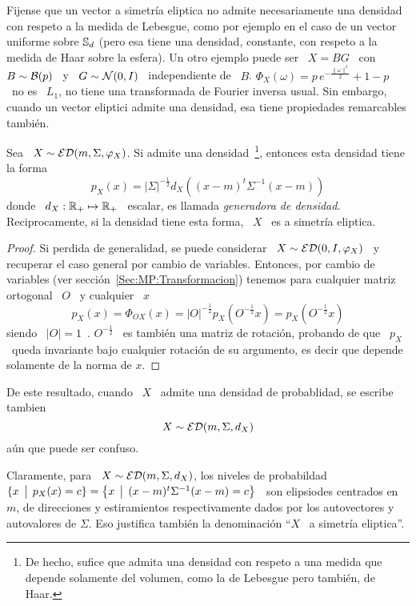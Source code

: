 Fijense  que  un vector  a  simetr\'ia  eliptica  no admite  necesariamente  una
densidad con respeto a la medida de  Lebesgue, como por ejemplo en el caso de un
vector uniforme  sobre $\mathbb{S}_d$  (pero esa tiene  una densidad,  constante, con
respeto a la medida de Haar sobre la esfera). Un otro ejemplo puede ser \ $X = B
G$  \ con  \  $B \sim  \mathcal{B}(p)$  \  y \  $G  \sim \mathcal{N}(0,I)$  \  independiente de  \
$B$. $\Phi_X(\omega)  = p \, e^{-\frac{\|  \omega \|^2}{2}} + 1  - p$ \  no es \
$L_1$,  \ie no tiene  una transformada  de Fourier  inversa usual.  Sin embargo,
cuando un vector eliptici admite una densidad, esa tiene propiedades remarcables
tambi\'en.
%
\begin{teorema}
%
  Sea \ $X \sim \mathcal{ED}(m,\Sigma,\varphi_X)$. Si  admite una  densidad~\footnote{De hecho, sufice  que admita
    una densidad  con respeto  a una medida  que depende solamente  del volumen,
    como la de Lebesgue pero  tambi\'en, de Haar.}, entonces esta densidad tiene
  la forma
  \[
  p_X(x)  = |\Sigma|^{-\frac12} d_X\left( (x-m)^t \Sigma^{-1} (x-m) \right)
  \]
  donde \ $d_X:  \mathbb{R}_+ \mapsto \mathbb{R}_+$ \ escalar,  es llamada {\em generadora
    de densidad}. Reciprocamente, si la densidad  tiene esta forma, \ $X$ \ es a
  simetr\'ia eliptica.
\end{teorema}
%
\begin{proof}
  Si perdida de generalidad, se puede considerar \ $X \sim \mathcal{ED}(0,I,\varphi_X)$ \
  y recuperar el  caso general por cambio de variables.  Entonces, por cambio de
  variables  (ver secci\'on~\ref{Sec:MP:Transformacion}) tenemos  para cualquier
  matriz ortogonal \ $O$ \ y cualquier \ $x$
  \[
  p_X(x) = \Phi_{O X}(x) = |O|^{-\frac12} p_X\left( O^{-\frac12} x \right) = p_X\left( O^{-\frac12} x \right)
  \]
  siendo \ $|O|  = 1$~\cite{Bha97, HorJoh13}. $O^{-\frac12}$ \  es tambi\'en una
  matriz  de  rotaci\'on,  probando de  que  \  $p_X$  \ queda  invariante  bajo
  cualquier rotaci\'on  de su  argumento, es decir  que depende solamente  de la
  norma de $x$.
\end{proof}

De este resultado, cuando \ $X$ \ admite una densidad de probablidad, se escribe tambien
%
\[
X \sim \mathcal{ED}(m,\Sigma,d_X)
\]
%
a\'un que puede ser confuso.

Claramente, para \ $X \sim  \mathcal{ED}(m,\Sigma,d_X)$, los niveles de probabildad \ $\{
x \:\: \big| \:\: p_X(x)  = c \} = \left\{  x \:\: \big| \:\: (x-m)^t \Sigma^{-1} (x-m) =  c \right\}$ \
son   elipsiodes  centrados   en   \  $m$,   de   direcciones  y   estiramientos
respectivamente  dados  por los  autovectores  y  autovalores  de $\Sigma$.  Eso
justifica tambi\'en la denominaci\'on ``$X$ \ a simetr\'ia eliptica''.

